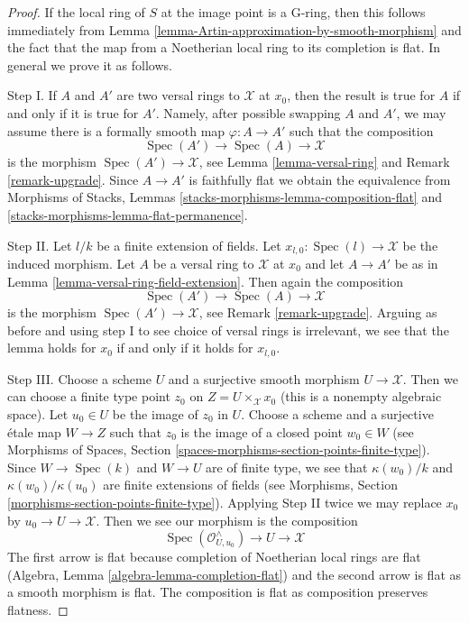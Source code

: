 \documentclass[10pt,a4paper]{amsart}
\theoremstyle{plain}
\theoremstyle{definition}
\theoremstyle{remark}
\numberwithin{equation}{subsection}
\def\Spec{\mathop{\mathrm{Spec}}}
\begin{document}
\begin{proof}
If the local ring of $S$ at the image point is a G-ring, then this
follows immediately from
Lemma \ref{lemma-Artin-approximation-by-smooth-morphism}
and the fact that the map from a Noetherian local ring to its
completion is flat. In general we prove it as follows.

\medskip\noindent
Step I. If $A$ and $A'$ are two versal rings to $\mathcal{X}$ at $x_0$,
then the result is true for $A$ if and only if it is true for $A'$.
Namely, after possible swapping $A$ and $A'$, we may assume there is
a formally smooth map $\varphi : A \to A'$ such that the composition
$$
\Spec(A') \to \Spec(A) \to \mathcal{X}
$$
is the morphism $\Spec(A') \to \mathcal{X}$, see
Lemma \ref{lemma-versal-ring} and
Remark \ref{remark-upgrade}.
Since $A \to A'$ is faithfully flat we obtain the equivalence from
Morphisms of Stacks, Lemmas \ref{stacks-morphisms-lemma-composition-flat} and
\ref{stacks-morphisms-lemma-flat-permanence}.

\medskip\noindent
Step II. Let $l/k$ be a finite extension of fields. Let
$x_{l, 0} : \Spec(l) \to \mathcal{X}$ be the induced morphism.
Let $A$ be a versal ring to $\mathcal{X}$ at $x_0$ and
let $A \to A'$ be as in Lemma \ref{lemma-versal-ring-field-extension}.
Then again the composition
$$
\Spec(A') \to \Spec(A) \to \mathcal{X}
$$
is the morphism $\Spec(A') \to \mathcal{X}$, see Remark \ref{remark-upgrade}.
Arguing as before and using step I to see choice of versal rings
is irrelevant, we see that the lemma holds for $x_0$ if and only
if it holds for $x_{l, 0}$.

\medskip\noindent
Step III. Choose a scheme $U$ and a surjective smooth morphism
$U \to \mathcal{X}$. Then we can choose a finite type point
$z_0$ on $Z = U \times_\mathcal{X} x_0$ (this is a nonempty
algebraic space). Let $u_0 \in U$ be the image of $z_0$ in $U$.
Choose a scheme and a surjective \'etale map $W \to Z$
such that $z_0$ is the image of a closed point $w_0 \in W$
(see Morphisms of Spaces, Section
\ref{spaces-morphisms-section-points-finite-type}).
Since $W \to \Spec(k)$ and $W \to U$ are of finite type,
we see that $\kappa(w_0)/k$ and $\kappa(w_0)/\kappa(u_0)$
are finite extensions of fields
(see Morphisms, Section \ref{morphisms-section-points-finite-type}).
Applying Step II twice we may replace $x_0$ by
$u_0 \to U \to \mathcal{X}$. Then we see our morphism is the composition
$$
\Spec(\mathcal{O}_{U, u_0}^\wedge) \to U \to \mathcal{X}
$$
The first arrow is flat because completion of Noetherian local rings
are flat (Algebra, Lemma \ref{algebra-lemma-completion-flat})
and the second arrow is flat as
a smooth morphism is flat. The composition is flat as composition
preserves flatness.
\end{proof}
\end{document}
